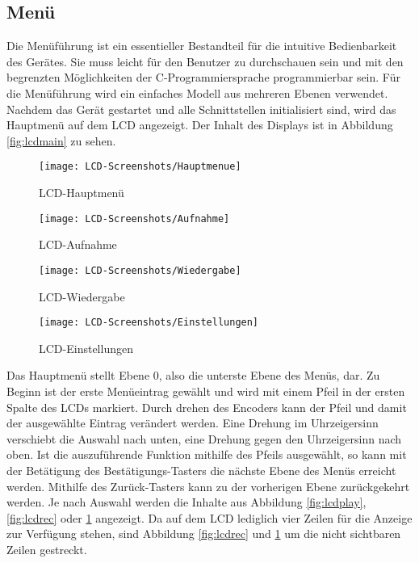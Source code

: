 \subsection{Menü}
Die Menüführung ist ein essentieller Bestandteil für die intuitive Bedienbarkeit des Gerätes. Sie muss leicht für den Benutzer zu durchschauen sein und mit den begrenzten Möglichkeiten der C-Programmiersprache programmierbar sein. Für die Menüführung wird ein einfaches Modell aus mehreren Ebenen verwendet. Nachdem das Gerät gestartet und alle Schnittstellen initialisiert sind, wird das Hauptmenü auf dem LCD angezeigt. Der Inhalt des Displays ist in Abbildung \ref{fig:lcdmain} zu sehen. 
\begin{figure}[h]
	\begin{minipage}{.22\linewidth}
		\centering
		\texttt{[image: LCD-Screenshots/Hauptmenue]}
		\caption{LCD-Hauptmenü}
		\label{fig:lcdmain}
	\end{minipage}
	\hfill
	\begin{minipage}{.22\linewidth}
		\centering
		\texttt{[image: LCD-Screenshots/Aufnahme]}
		\caption{LCD-Aufnahme}
		\label{fig:lcdrec}
	\end{minipage}
	\hfill
	\begin{minipage}{.22\linewidth}
		\centering
		\texttt{[image: LCD-Screenshots/Wiedergabe]}
		\caption{LCD-Wiedergabe}
		\label{fig:lcdplay}
	\end{minipage}
	\hfill
	\begin{minipage}{.22\linewidth}
		\centering
		\texttt{[image: LCD-Screenshots/Einstellungen]}
		\caption{LCD-Einstellungen}
		\label{fig:lcdset}
	\end{minipage}
\end{figure}
Das Hauptmenü stellt Ebene 0, also die unterste Ebene des Menüs, dar. Zu Beginn ist der erste Menüeintrag gewählt und wird mit einem Pfeil in der ersten Spalte des LCDs markiert. Durch drehen des Encoders kann der Pfeil und damit der ausgewählte Eintrag verändert werden. Eine Drehung im Uhrzeigersinn verschiebt die Auswahl nach unten, eine Drehung gegen den Uhrzeigersinn nach oben. Ist die auszuführende Funktion mithilfe des Pfeils ausgewählt, so kann mit der Betätigung des Bestätigungs-Tasters die nächste Ebene des Menüs erreicht werden. Mithilfe des Zurück-Tasters kann zu der vorherigen Ebene zurückgekehrt werden. Je nach Auswahl werden die Inhalte aus Abbildung \ref{fig:lcdplay}, \ref{fig:lcdrec} oder \ref{fig:lcdset} angezeigt. Da auf dem LCD lediglich vier Zeilen für die Anzeige zur Verfügung stehen, sind Abbildung \ref{fig:lcdrec} und \ref{fig:lcdset} um die nicht sichtbaren Zeilen gestreckt.
